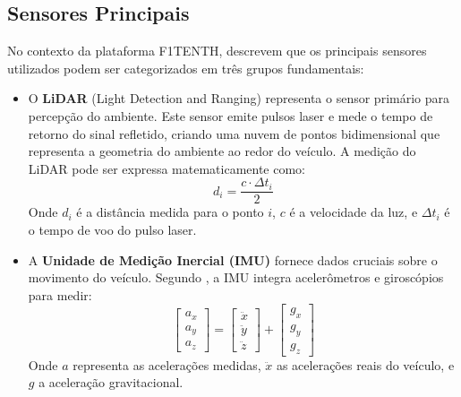 \subsection{Sensores Principais}

No contexto da plataforma F1TENTH, \cite{OKelly2020F1TENTH} descrevem que os
principais sensores utilizados podem ser categorizados em três grupos
fundamentais:

\begin{itemize}
    \item O \textbf{LiDAR} (Light Detection and Ranging) representa o sensor primário
          para percepção do ambiente. Este sensor emite pulsos laser e mede o tempo de
          retorno do sinal refletido, criando uma nuvem de pontos bidimensional que
          representa a geometria do ambiente ao redor do veículo. A medição do LiDAR pode
          ser expressa matematicamente como:
          \begin{equation}
              d_i = \frac{c \cdot \Delta t_i}{2}
              \label{eq:lidar_measurement}
          \end{equation}
          Onde $d_i$ é a distância medida para o ponto $i$, $c$ é a velocidade da luz, e $\Delta t_i$ é o tempo de voo do pulso laser.

    \item A \textbf{Unidade de Medição Inercial (IMU)} fornece dados cruciais sobre o
          movimento do veículo. Segundo \cite{Stachowicz2023FastRLAP}, a IMU integra
          acelerômetros e giroscópios para medir:
          \begin{equation}
              \begin{bmatrix}
                  a_x \\
                  a_y \\
                  a_z
              \end{bmatrix} =
              \begin{bmatrix}
                  \ddot{x} \\
                  \ddot{y} \\
                  \ddot{z}
              \end{bmatrix} +
              \begin{bmatrix}
                  g_x \\
                  g_y \\
                  g_z
              \end{bmatrix}
              \label{eq:imu_acceleration}
          \end{equation}
          Onde $a$ representa as acelerações medidas, $\ddot{x}$ as acelerações reais do veículo, e $g$ a aceleração gravitacional.


\end{itemize}
